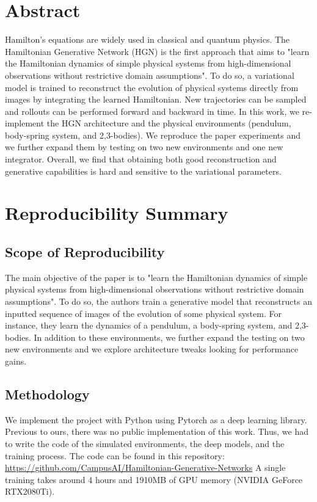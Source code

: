 \section*{\centering Abstract}
Hamilton's equations are widely used in classical and quantum physics. The Hamiltonian Generative Network (HGN) is the first approach that aims to "learn the Hamiltonian dynamics of simple physical systems from high-dimensional observations without restrictive domain assumptions". To do so, a variational model is trained to reconstruct the evolution of physical systems directly from images by integrating the learned Hamiltonian. New trajectories can be sampled and rollouts can be performed forward and backward in time. In this work, we re-implement the HGN architecture and the physical environments (pendulum, body-spring system, and 2,3-bodies). We reproduce the paper experiments and we further expand them by testing on two new environments and one new integrator. Overall, we find that obtaining both good reconstruction and generative capabilities is hard and sensitive to the variational parameters.

\section*{\centering Reproducibility Summary}

\subsection*{Scope of Reproducibility}
The main objective of the paper is to "learn the Hamiltonian dynamics of simple physical systems from high-dimensional observations without restrictive domain assumptions".
To do so, the authors train a generative model that reconstructs an inputted sequence of images of the evolution of some physical system.
For instance, they learn the dynamics of a pendulum, a body-spring system, and 2,3-bodies.
In addition to these environments, we further expand the testing on two new environments and we explore architecture tweaks looking for performance gains.

\subsection*{Methodology}
We implement the project with Python using Pytorch \cite{pytorch} as a deep learning library.
Previous to ours, there was no public implementation of this work.
Thus, we had to write the code of the simulated environments, the deep models, and the training process.
The code can be found in this repository: \href{https://github.com/CampusAI/Hamiltonian-Generative-Networks}{https://github.com/CampusAI/Hamiltonian-Generative-Networks}
A single training takes around 4 hours and 1910MB of GPU memory (NVIDIA GeForce RTX2080Ti).


